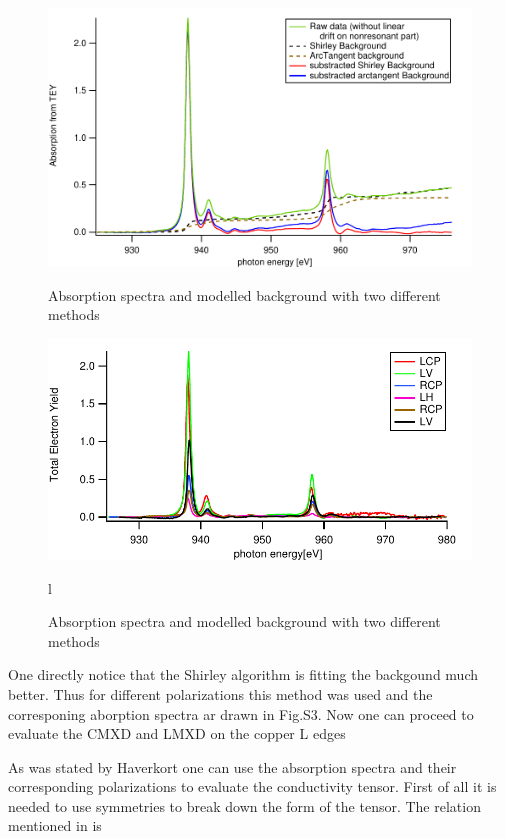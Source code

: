 \documentclass[twoside,twocolumn, elsart]{article}
\begin{document}
\begin{figure}
    \begin{minipage}[bp!]{\columnwidth}
        \includegraphics[width=\textwidth]{ShirleyBack.pdf}
        \caption{Absorption spectra and modelled background with two different methods}
        \label{fig2}
    \end{minipage}
    \hfil
	\begin{minipage}[bp!]{\columnwidth}
        \includegraphics[width=\textwidth]{TEY.pdf}
        \caption{Absorption spectra and modelled background with two different methods}
        \label{fig2}
    \end{minipage}l
\end{figure}
One directly notice that the Shirley algorithm is fitting the backgound much better. Thus for different polarizations this method was used and the corresponing aborption spectra ar drawn in Fig.S3. Now one can proceed to evaluate the CMXD and LMXD on the copper L edges

As was stated by Haverkort \cite{Haverkort} one can use the absorption spectra and their corresponding polarizations to evaluate the conductivity tensor. First of all it is needed to use symmetries to break down the form of the tensor. The relation mentioned in \cite{Haverkort} is
\end{document}
